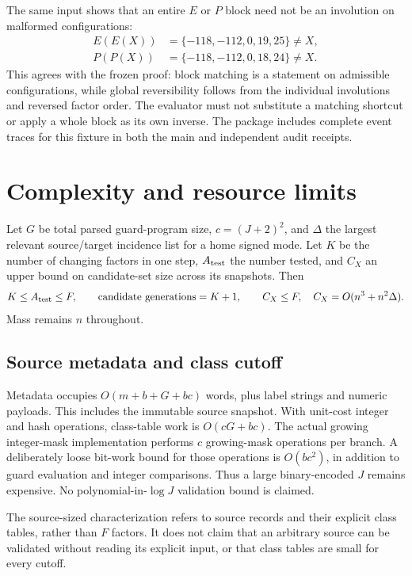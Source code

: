 \documentclass[11pt,a4paper]{article}
\numberwithin{equation}{section}
\begin{document}
The same input shows that an entire $E$ or $P$ block need not be an involution on malformed configurations:
\begin{align*}
E(E(X))&=\{-118,-112,0,19,25\}\ne X,\\
P(P(X))&=\{-118,-112,0,18,24\}\ne X.
\end{align*}
This agrees with the frozen proof: block matching is a statement on admissible configurations, while global reversibility follows from the individual involutions and reversed factor order. The evaluator must not substitute a matching shortcut or apply a whole block as its own inverse. The package includes complete event traces for this fixture in both the main and independent audit receipts.

\section{Complexity and resource limits}\label{fpa:lz:sec:complexity}
Let $G$ be total parsed guard-program size, $c=(J+2)^2$, and $\Delta$ the largest relevant source/target incidence list for a home signed mode. Let $K$ be the number of changing factors in one step, $A_{\rm test}$ the number tested, and $C_X$ an upper bound on candidate-set size across its snapshots. Then
\[
K\leq A_{\rm test}\leq F,\qquad
\text{candidate generations}=K+1,\qquad
C_X\leq F,\quad C_X=O(n^3+n^2\Delta).
\]
Mass remains $n$ throughout.

\subsection{Source metadata and class cutoff}
Metadata occupies $O(m+b+G+bc)$ words, plus label strings and numeric payloads. This includes the immutable source snapshot. With unit-cost integer and hash operations, class-table work is $O(cG+bc)$. The actual growing integer-mask implementation performs $c$ growing-mask operations per branch. A deliberately loose bit-work bound for those operations is $O(bc^2)$, in addition to guard evaluation and integer comparisons. Thus a large binary-encoded $J$ remains expensive. No polynomial-in-$\log J$ validation bound is claimed.

The source-sized characterization refers to source records and their explicit class tables, rather than $F$ factors. It does not claim that an arbitrary source can be validated without reading its explicit input, or that class tables are small for every cutoff.
\end{document}
